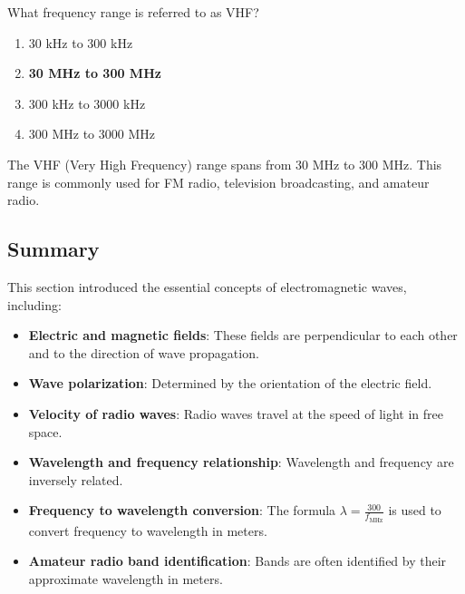 
\begin{tcolorbox}[colback=gray!10!white,colframe=black!75!black,title={T3B08}]
    What frequency range is referred to as VHF?
    \begin{enumerate}[label=\Alph*,noitemsep]
        \item 30 kHz to 300 kHz
        \item \textbf{30 MHz to 300 MHz}
        \item 300 kHz to 3000 kHz
        \item 300 MHz to 3000 MHz
    \end{enumerate}
\end{tcolorbox}
The VHF (Very High Frequency) range spans from 30 MHz to 300 MHz. This range is commonly used for FM radio, television broadcasting, and amateur radio.


\subsection*{Summary}
This section introduced the essential concepts of electromagnetic waves, including:
\begin{itemize}
    \item \textbf{Electric and magnetic fields}: These fields are perpendicular to each other and to the direction of wave propagation.
    \item \textbf{Wave polarization}: Determined by the orientation of the electric field.
    \item \textbf{Velocity of radio waves}: Radio waves travel at the speed of light in free space.
    \item \textbf{Wavelength and frequency relationship}: Wavelength and frequency are inversely related.
    \item \textbf{Frequency to wavelength conversion}: The formula $\lambda = \frac{300}{f_{\text{MHz}}}$ is used to convert frequency to wavelength in meters.
    \item \textbf{Amateur radio band identification}: Bands are often identified by their approximate wavelength in meters.
\end{itemize}
